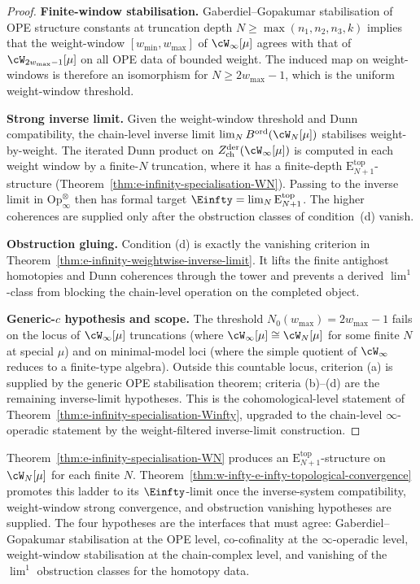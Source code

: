 \begin{proof}
\label{rem:w-infty-convergence-evidence}
\textbf{Finite-window stabilisation.}
Gaberdiel--Gopakumar stabilisation of OPE structure constants at
truncation depth $N \ge \max(n_1,n_2,n_3,k)$ implies that the
weight-window $[w_{\min}, w_{\max}]$ of $\cW_\infty[\mu]$ agrees with
that of $\cW_{2w_{\max}-1}[\mu]$ on all OPE data of bounded weight. The
induced map on weight-windows is therefore an isomorphism for
$N \ge 2w_{\max} - 1$, which is the uniform weight-window threshold.

\textbf{Strong inverse limit.}
Given the weight-window threshold and Dunn compatibility, the chain-level inverse limit
$\lim_N B^{\mathrm{ord}}(\cW_N[\mu])$ stabilises weight-by-weight. The
iterated Dunn product on
$Z^{\mathrm{der}}_{\mathrm{ch}}(\cW_\infty[\mu])$ is computed in each
weight window by a finite-$N$ truncation, where it has a finite-depth
$\mathrm{E}_{N+1}^{\mathrm{top}}$-structure
(Theorem~\ref{thm:e-infinity-specialisation-WN}). Passing to the inverse
limit in $\mathrm{Op}_\infty^{\otimes}$ then has formal target
$\Einfty = \lim_N \mathrm{E}_{N+1}^{\mathrm{top}}$. The higher
coherences are supplied only after the obstruction classes of
condition~\textup{(d)} vanish.

\textbf{Obstruction gluing.}
Condition \textup{(d)} is exactly the vanishing criterion in
Theorem~\ref{thm:e-infinity-weightwise-inverse-limit}. It lifts the
finite antighost homotopies and Dunn coherences through the tower and
prevents a derived \(\lim^1\)-class from blocking the chain-level
operation on the completed object.

\textbf{Generic-$c$ hypothesis and scope.}
The threshold $N_0(w_{\max}) = 2w_{\max} - 1$ fails on the locus of
$\cW_\infty[\mu]$ truncations (where $\cW_\infty[\mu] \cong \cW_N[\mu]$
for some finite $N$ at special $\mu$) and on minimal-model loci (where
the simple quotient of $\cW_\infty$ reduces to a finite-type algebra).
Outside this countable locus, criterion \textup{(a)} is supplied by
the generic OPE stabilisation theorem; criteria \textup{(b)--(d)} are
the remaining inverse-limit hypotheses.
This is the cohomological-level statement of
Theorem~\ref{thm:e-infinity-specialisation-Winfty}, upgraded to the
chain-level $\infty$-operadic statement by the weight-filtered
inverse-limit construction.
\end{proof}

\begin{remark}
\label{rem:winfty-convergence-vs-finite-N}
Theorem~\ref{thm:e-infinity-specialisation-WN} produces an
$\mathrm{E}_{N+1}^{\mathrm{top}}$-structure on $\cW_N[\mu]$ for each
finite $N$. Theorem~\ref{thm:w-infty-e-infty-topological-convergence}
promotes this ladder to its $\Einfty$-limit once the inverse-system
compatibility, weight-window strong convergence, and obstruction
vanishing hypotheses are supplied. The four hypotheses are the interfaces
that must agree: Gaberdiel--Gopakumar stabilisation at the OPE level,
co-cofinality at the $\infty$-operadic level, weight-window
stabilisation at the chain-complex level, and vanishing of the
\(\lim^1\) obstruction classes for the homotopy data.
\end{remark}

